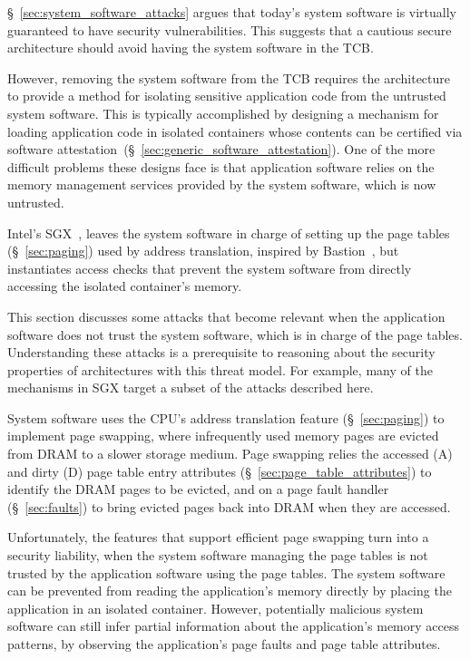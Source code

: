 \label{sec:address_translation_attacks}

\S~\ref{sec:system_software_attacks} argues that today's system software is
virtually guaranteed to have security vulnerabilities. This suggests that a
cautious secure architecture should avoid having the system software in the
TCB.

However, removing the system software from the TCB requires the architecture to
provide a method for isolating sensitive application code from the untrusted
system software. This is typically accomplished by designing a mechanism for
loading application code in isolated containers whose contents can be certified
via software attestation~(\S~\ref{sec:generic_software_attestation}). One of the
more difficult problems these designs face is that application software
relies on the memory management services provided by the system software, which
is now untrusted.

Intel's SGX~\cite{mckeen2013sgx, anati2013sgx}, leaves the system software in
charge of setting up the page tables (\S~\ref{sec:paging}) used by address
translation, inspired by Bastion~\cite{champagne2010bastion}, but instantiates
access checks that prevent the system software from directly accessing the
isolated container's memory.

This section discusses some attacks that become relevant when the application
software does not trust the system software, which is in charge of the page
tables. Understanding these attacks is a prerequisite to reasoning about the
security properties of architectures with this threat model. For example, many
of the mechanisms in SGX target a subset of the attacks described here.


\label{sec:fault_tracking_attacks}

System software uses the CPU's address translation feature
(\S~\ref{sec:paging}) to implement page swapping, where infrequently used
memory pages are evicted from DRAM to a slower storage medium. Page swapping
relies the accessed (A) and dirty (D) page table entry attributes
(\S~\ref{sec:page_table_attributes}) to identify the DRAM pages to be evicted,
and on a page fault handler (\S~\ref{sec:faults}) to bring evicted pages back
into DRAM when they are accessed.

Unfortunately, the features that support efficient page swapping turn into a
security liability, when the system software managing the page tables is not
trusted by the application software using the page tables. The system software
can be prevented from reading the application's memory directly by placing the
application in an isolated container. However, potentially malicious system
software can still infer partial information about the application's memory
access patterns, by observing the application's page faults and page table
attributes.

